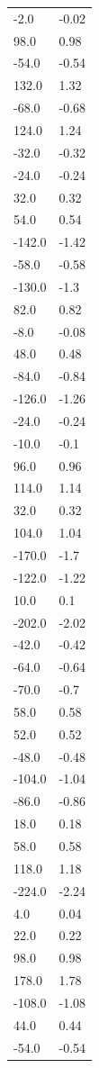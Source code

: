 \begin{longtable}{ll}
-2.0 & -0.02 \\
98.0 & 0.98 \\
-54.0 & -0.54 \\
132.0 & 1.32 \\
-68.0 & -0.68 \\
124.0 & 1.24 \\
-32.0 & -0.32 \\
-24.0 & -0.24 \\
32.0 & 0.32 \\
54.0 & 0.54 \\
-142.0 & -1.42 \\
-58.0 & -0.58 \\
-130.0 & -1.3 \\
82.0 & 0.82 \\
-8.0 & -0.08 \\
48.0 & 0.48 \\
-84.0 & -0.84 \\
-126.0 & -1.26 \\
-24.0 & -0.24 \\
-10.0 & -0.1 \\
96.0 & 0.96 \\
114.0 & 1.14 \\
32.0 & 0.32 \\
104.0 & 1.04 \\
-170.0 & -1.7 \\
-122.0 & -1.22 \\
10.0 & 0.1 \\
-202.0 & -2.02 \\
-42.0 & -0.42 \\
-64.0 & -0.64 \\
-70.0 & -0.7 \\
58.0 & 0.58 \\
52.0 & 0.52 \\
-48.0 & -0.48 \\
-104.0 & -1.04 \\
-86.0 & -0.86 \\
18.0 & 0.18 \\
58.0 & 0.58 \\
118.0 & 1.18 \\
-224.0 & -2.24 \\
4.0 & 0.04 \\
22.0 & 0.22 \\
98.0 & 0.98 \\
178.0 & 1.78 \\
-108.0 & -1.08 \\
44.0 & 0.44 \\
-54.0 & -0.54 \\

\end{longtable}
